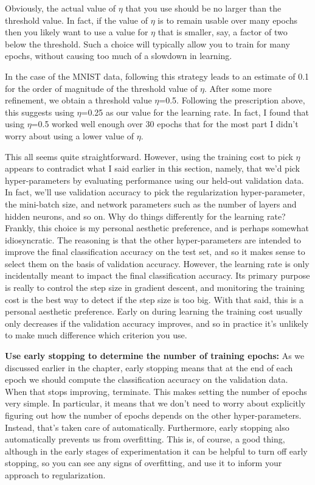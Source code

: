 \documentclass[a4paper,twoside,10pt]{book}
\begin{document}
Obviously, the actual value of $\eta$ that you use should be no larger than the threshold value. In fact, if the value of $\eta$ is to remain usable over many epochs then you likely want to use a value for $\eta$ that is smaller, say, a factor of two below the threshold. Such a choice will typically allow you to train for many epochs, without causing too much of a slowdown in learning.

In the case of the MNIST data, following this strategy leads to an estimate of 0.1 for the order of magnitude of the threshold value of $\eta$. After some more refinement, we obtain a threshold value $\eta$=0.5. Following the prescription above, this suggests using $\eta$=0.25 as our value for the learning rate. In fact, I found that using $\eta$=0.5 worked well enough over 30 epochs that for the most part I didn't worry about using a lower value of $\eta$.

This all seems quite straightforward. However, using the training cost to pick $\eta$ appears to contradict what I said earlier in this section, namely, that we'd pick hyper-parameters by evaluating performance using our held-out validation data. In fact, we'll use validation accuracy to pick the regularization hyper-parameter, the mini-batch size, and network parameters such as the number of layers and hidden neurons, and so on. Why do things differently for the learning rate? Frankly, this choice is my personal aesthetic preference, and is perhaps somewhat idiosyncratic. The reasoning is that the other hyper-parameters are intended to improve the final classification accuracy on the test set, and so it makes sense to select them on the basis of validation accuracy. However, the learning rate is only incidentally meant to impact the final classification accuracy. Its primary purpose is really to control the step size in gradient descent, and monitoring the training cost is the best way to detect if the step size is too big. With that said, this is a personal aesthetic preference. Early on during learning the training cost usually only decreases if the validation accuracy improves, and so in practice it's unlikely to make much difference which criterion you use.


\textbf{Use early stopping to determine the number of training epochs:} As we discussed earlier in the chapter, early stopping means that at the end of each epoch we should compute the classification accuracy on the validation data. When that stops improving, terminate. This makes setting the number of epochs very simple. In particular, it means that we don't need to worry about explicitly figuring out how the number of epochs depends on the other hyper-parameters. Instead, that's taken care of automatically. Furthermore, early stopping also automatically prevents us from overfitting. This is, of course, a good thing, although in the early stages of experimentation it can be helpful to turn off early stopping, so you can see any signs of overfitting, and use it to inform your approach to regularization.
\end{document}
